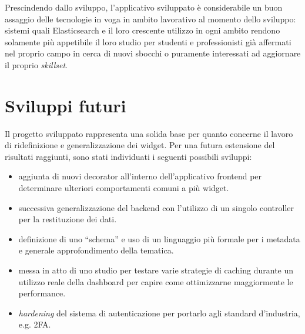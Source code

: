 Prescindendo dallo sviluppo, l'applicativo sviluppato è considerabile un buon assaggio delle tecnologie in voga in ambito lavorativo al momento dello sviluppo: sistemi quali Elasticsearch e il loro crescente utilizzo in ogni ambito rendono solamente più appetibile il loro studio per studenti e professionisti già affermati nel proprio campo  in cerca di nuovi sbocchi o puramente interessati ad aggiornare il proprio \textit{skillset}.

\chapter{Sviluppi futuri}
Il progetto sviluppato rappresenta una solida base per quanto concerne il lavoro di ridefinizione e generalizzazione dei widget. Per una futura estensione del risultati raggiunti, sono stati individuati i seguenti possibili sviluppi:
\begin{itemize}
    \item aggiunta di nuovi decorator all'interno dell'applicativo frontend per determinare ulteriori comportamenti comuni a più widget.
    \item successiva generalizzazione del backend con l'utilizzo di un singolo controller per la restituzione dei dati.
    \item definizione di uno ``schema'' e uso di un linguaggio più formale per i metadata e generale approfondimento della tematica.
    \item messa in atto di uno studio per testare varie strategie di caching durante un utilizzo reale della dashboard per capire come ottimizzarne maggiormente le performance.
    \item \textit{hardening} del sistema di autenticazione per portarlo agli standard d'industria, e.g. 2FA.
\end{itemize}